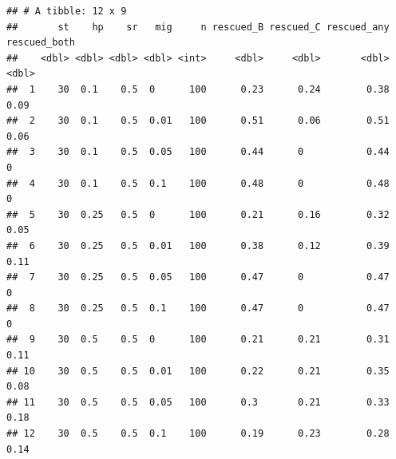 \documentclass[
]{article}
\newenvironment{Shaded}{\begin{snugshade}}{\end{snugshade}}
\newcommand{\AttributeTok}[1]{\textcolor[rgb]{0.13,0.29,0.53}{#1}}
\newcommand{\CommentTok}[1]{\textcolor[rgb]{0.56,0.35,0.01}{\textit{#1}}}
\newcommand{\DecValTok}[1]{\textcolor[rgb]{0.00,0.00,0.81}{#1}}
\newcommand{\FloatTok}[1]{\textcolor[rgb]{0.00,0.00,0.81}{#1}}
\newcommand{\FunctionTok}[1]{\textcolor[rgb]{0.13,0.29,0.53}{\textbf{#1}}}
\newcommand{\NormalTok}[1]{#1}
\newcommand{\OtherTok}[1]{\textcolor[rgb]{0.56,0.35,0.01}{#1}}
\newcommand{\SpecialCharTok}[1]{\textcolor[rgb]{0.81,0.36,0.00}{\textbf{#1}}}
\begin{document}
\begin{Shaded}
\end{Shaded}

\begin{verbatim}
## # A tibble: 12 x 9
##       st    hp    sr   mig     n rescued_B rescued_C rescued_any rescued_both
##    <dbl> <dbl> <dbl> <dbl> <int>     <dbl>     <dbl>       <dbl>        <dbl>
##  1    30  0.1    0.5  0      100      0.23      0.24        0.38         0.09
##  2    30  0.1    0.5  0.01   100      0.51      0.06        0.51         0.06
##  3    30  0.1    0.5  0.05   100      0.44      0           0.44         0   
##  4    30  0.1    0.5  0.1    100      0.48      0           0.48         0   
##  5    30  0.25   0.5  0      100      0.21      0.16        0.32         0.05
##  6    30  0.25   0.5  0.01   100      0.38      0.12        0.39         0.11
##  7    30  0.25   0.5  0.05   100      0.47      0           0.47         0   
##  8    30  0.25   0.5  0.1    100      0.47      0           0.47         0   
##  9    30  0.5    0.5  0      100      0.21      0.21        0.31         0.11
## 10    30  0.5    0.5  0.01   100      0.22      0.21        0.35         0.08
## 11    30  0.5    0.5  0.05   100      0.3       0.21        0.33         0.18
## 12    30  0.5    0.5  0.1    100      0.19      0.23        0.28         0.14
\end{verbatim}
\end{document}
